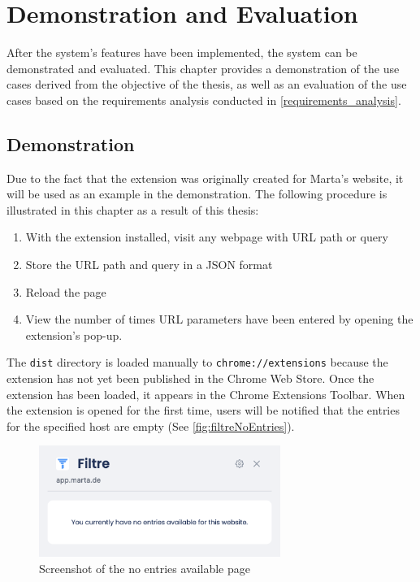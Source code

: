 \newpage
\chapter{Demonstration and Evaluation}
After the system's features have been implemented, the system can be demonstrated and evaluated. This chapter provides a demonstration of the use cases derived from the objective of the thesis, as well as an evaluation of the use cases based on the requirements analysis conducted in \autoref{requirements_analysis}.

\section{Demonstration}
Due to the fact that the extension was originally created for Marta's website, it will be used as an example in the demonstration. The following procedure is illustrated in this chapter as a result of this thesis:

\begin{enumerate}
  \item With the extension installed, visit any webpage with URL path or query
  \item Store the URL path and query in a JSON format
  \item Reload the page
  \item View the number of times URL parameters have been entered by opening the extension's pop-up.
\end{enumerate}

The \texttt{dist} directory is loaded manually to \verb;chrome://extensions; because the extension has not yet been published in the Chrome Web Store. Once the extension has been loaded, it appears in the Chrome Extensions Toolbar. When the extension is opened for the first time, users will be notified that the entries for the specified host are empty (See \autoref{fig:filtreNoEntries}).

\begin{figure}[H]
  \centering
  \includegraphics[width=0.7\textwidth]{assets/screenshot_filtre_no_entries.png}
  \caption{Screenshot of the no entries available page}
  \label{fig:filtreNoEntries}
\end{figure}

